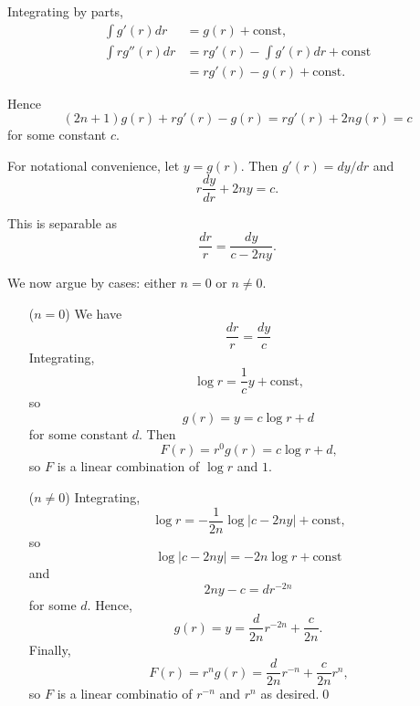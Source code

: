 \documentclass[oneside]{article}
\newcommand\abs[1]{\left|#1\right|}
\begin{document}
\begin{enumerate}[label=\textbf{\arabic*.}]
Integrating by parts,\begin{align*}
  \int g'(r)dr &= g(r) + \mathrm{const}\text{,} \\
  \int rg''(r)dr &= rg'(r) - \int g'(r)dr + \mathrm{const} \\
  &= rg'(r) - g(r) + \mathrm{const} \text{.}
\end{align*}

Hence\[
  (2n + 1)g(r) + rg'(r) - g(r) = rg'(r) + 2ng(r) = c
\] for some constant $c$.

For notational convenience, let $y = g(r)$. Then $g'(r) = dy/dr$ and \[
  r\frac{dy}{dr} + 2ny = c \text{.}
\]

This is separable as \[
  \frac{dr}{r} = \frac{dy}{c-2ny} \text{.}
\]

We now argue by cases: either $n = 0$ or $n \neq 0$.
\begin{itemize}[leftmargin=52pt]
\item[($n = 0$)] We have\[
  \frac{dr}{r} = \frac{dy}{c}
\] Integrating,\[
  \log r = \frac{1}{c}y + \mathrm{const}\text{,}
\] so \[
  g(r) = y = c \log r + d
\] for some constant $d$. Then \[
  F(r) = r^0g(r) = c \log r + d \text{,}
\]so $F$ is a linear combination of $\log r$ and $1$.

\item[($n \neq 0$)]
Integrating,\[
  \log r = -\frac{1}{2n}\log\abs{c-2ny} + \mathrm{const}\text{,}
\] so \[
   \log\abs{c-2ny} = -2n\log r + \mathrm{const}
\] and \[
  2ny - c = dr^{-2n}
\] for some $d$. Hence,
\[
  g(r) = y = \frac{d}{2n}r^{-2n} + \frac{c}{2n} \text{.}
\] Finally,\[
  F(r) = r^ng(r) = \frac{d}{2n}r^{-n} + \frac{c}{2n}r^n\text{,}
\] so $F$ is a linear combinatio of $r^{-n}$ and $r^n$ as desired.\qed
\end{itemize}

  \end{enumerate}
\end{document}
